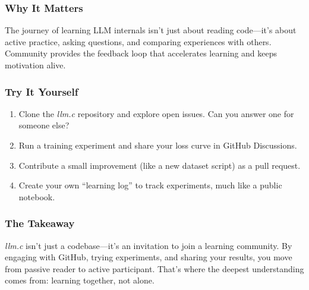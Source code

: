 \documentclass[
  letterpaper,
  DIV=11,
  numbers=noendperiod]{scrreprt}
\providecommand{\tightlist}{%
  \setlength{\itemsep}{0pt}\setlength{\parskip}{0pt}}
\begin{document}
\subsubsection{Why It Matters}\label{why-it-matters-74}

The journey of learning LLM internals isn't just about reading
code---it's about active practice, asking questions, and comparing
experiences with others. Community provides the feedback loop that
accelerates learning and keeps motivation alive.

\subsubsection{Try It Yourself}\label{try-it-yourself-88}

\begin{enumerate}
\def\labelenumi{\arabic{enumi}.}
\tightlist
\item
  Clone the \emph{llm.c} repository and explore open issues. Can you
  answer one for someone else?
\item
  Run a training experiment and share your loss curve in GitHub
  Discussions.
\item
  Contribute a small improvement (like a new dataset script) as a pull
  request.
\item
  Create your own ``learning log'' to track experiments, much like a
  public notebook.
\end{enumerate}

\subsubsection{The Takeaway}\label{the-takeaway-89}

\emph{llm.c} isn't just a codebase---it's an invitation to join a
learning community. By engaging with GitHub, trying experiments, and
sharing your results, you move from passive reader to active
participant. That's where the deepest understanding comes from: learning
together, not alone.
\end{document}
